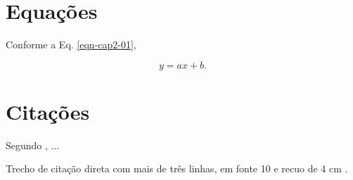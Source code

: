 \section{Equações}

Conforme a Eq. \ref{eqn-cap2-01},

\begin{equation}
	\label{eqn-cap2-01}
	y = a x + b.
\end{equation}

\section{Citações}

Segundo , ...

\begin{citacao}
Trecho de citação direta com mais de três linhas, em fonte 10 e recuo de 4 cm \cite{Sommerville2007}.
\end{citacao}
